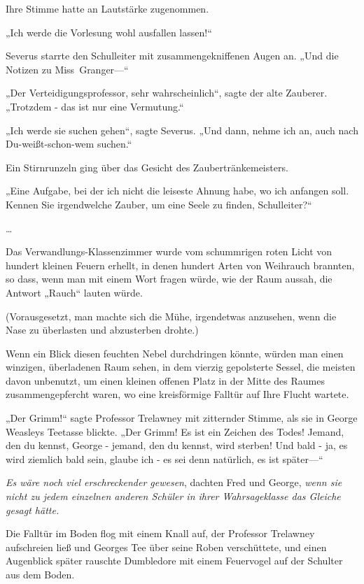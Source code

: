 {Ihre Stimme hatte an Lautstärke zugenommen.

„Ich werde die Vorlesung wohl ausfallen lassen!“

Severus starrte den Schulleiter mit zusammengekniffenen Augen an. „Und die Notizen zu Miss~Granger—“

„Der Verteidigungsprofessor, sehr wahrscheinlich“, sagte der alte Zauberer. „Trotzdem - das ist nur eine Vermutung.“

„Ich werde sie suchen gehen“, sagte Severus. „Und dann, nehme ich an, auch nach Du-weißt-schon-wem suchen.“

Ein Stirnrunzeln ging über das Gesicht des Zaubertränkemeisters.

„Eine Aufgabe, bei der ich nicht die leiseste Ahnung habe, wo ich anfangen soll. Kennen Sie irgendwelche Zauber, um eine Seele zu finden, Schulleiter?“

…

Das Verwandlungs-Klassenzimmer wurde vom schummrigen roten Licht von hundert kleinen Feuern erhellt, in denen hundert Arten von Weihrauch brannten, so dass, wenn man mit einem Wort fragen würde, wie der Raum aussah, die Antwort „Rauch“ lauten würde.

(Vorausgesetzt, man machte sich die Mühe, irgendetwas anzusehen, wenn die Nase zu überlasten und abzusterben drohte.)

Wenn ein Blick diesen feuchten Nebel durchdringen könnte, würden man einen winzigen, überladenen Raum sehen, in dem vierzig gepolsterte Sessel, die meisten davon unbenutzt, um einen kleinen offenen Platz in der Mitte des Raumes zusammengepfercht waren, wo eine kreisförmige Falltür auf Ihre Flucht wartete.

„Der Grimm!“ sagte Professor Trelawney mit zitternder Stimme, als sie in George Weasleys Teetasse blickte. „Der Grimm! Es ist ein Zeichen des Todes! Jemand, den du kennst, George - jemand, den du kennst, wird sterben! Und bald - ja, es wird ziemlich bald sein, glaube ich - es sei denn natürlich, es ist später—“

\emph{Es wäre noch viel erschreckender gewesen}, dachten Fred und George, \emph{wenn sie nicht zu jedem einzelnen anderen Schüler in ihrer Wahrsageklasse das Gleiche gesagt hätte.}

Die Falltür im Boden flog mit einem Knall auf, der Professor Trelawney aufschreien ließ und Georges Tee über seine Roben verschüttete, und einen Augenblick später rauschte Dumbledore mit einem Feuervogel auf der Schulter aus dem Boden.

}
